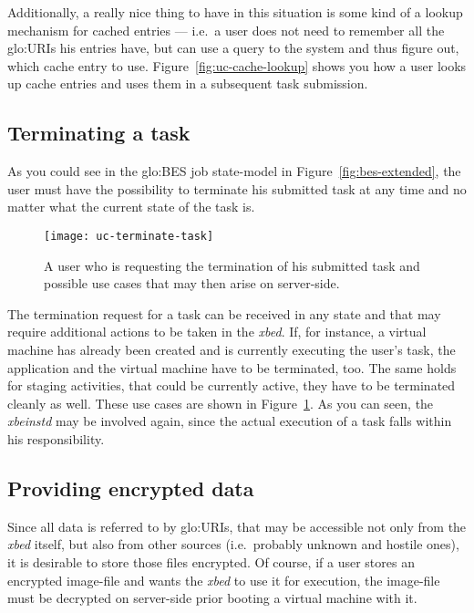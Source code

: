 Additionally, a really  nice thing to have in this  situation is some kind
of a lookup mechanism for cached  entries --- i.e.~a user does not need to
remember all the  \gls{glo:URI}s his entries have, but can  use a query to
the    system   and   thus    figure   out,    which   cache    entry   to
use. Figure~\ref{fig:uc-cache-lookup} shows you  how a user looks up cache
entries and uses them in a subsequent task submission.

\subsection{Terminating a task}
\label{sec:uc-terminate-task}

As   you   could   see   in   the   \gls{glo:BES}   job   state-model   in
Figure~\ref{fig:bes-extended},  the  user  must  have the  possibility  to
terminate his  submitted task at any  time and no matter  what the current
state of the task is.

\begin{figure}[h!]
  \begin{center}
    \texttt{[image: uc-terminate-task]}
  \end{center}
  \caption[UC Terminate Task]{A user  who is requesting the termination of
    his  submitted task  and possible  use cases  that may  then  arise on
    server-side.}
  \label{fig:uc-terminate-task}
\end{figure}

The termination request  for a task can be received in  any state and that
may require  additional actions to be  taken in the  \emph{xbed}.  If, for
instance,  a virtual  machine has  already been  created and  is currently
executing the user's task, the application and the virtual machine have to
be terminated, too.  The same  holds for staging activities, that could be
currently active, they  have to be terminated cleanly  as well.  These use
cases are  shown in  Figure~\ref{fig:uc-terminate-task}. As you  can seen,
the \emph{xbeinstd} may be involved again, since the actual execution of a
task falls within his responsibility.

\subsection{Providing encrypted data}
\label{sec:uc-ecrypted-data}

Since all  data is referred to  by \gls{glo:URI}s, that  may be accessible
not  only  from  the  \emph{xbed}  itself, but  also  from  other  sources
(i.e.~probably unknown and  hostile ones), it is desirable  to store those
files encrypted. Of  course, if a user stores  an encrypted image-file and
wants  the \emph{xbed} to  use it  for execution,  the image-file  must be
decrypted on server-side prior booting a virtual machine with it.

